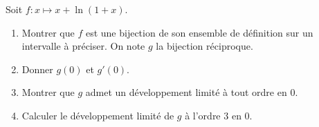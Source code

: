 \begin{enonce}
\begin{exercise}[ID={RMS133 E1373},subtitle={IMT PSI 2022},tags={},difficulty={}]
  Soit $f:x\mapsto x + \ln(1+x)$.
  \begin{enumerate}
    \item Montrer que $f$ est une bijection de son ensemble de définition sur un intervalle à préciser.
      On note $g$ la bijection réciproque.

    \item Donner $g(0)$ et $g'(0)$.

    \item Montrer que $g$ admet un développement limité à tout ordre en $0$.

    \item Calculer le développement limité de $g$ à l'ordre $3$ en $0$.
  \end{enumerate}
\end{exercise}
\begin{solution}
\end{solution}
\end{enonce}
